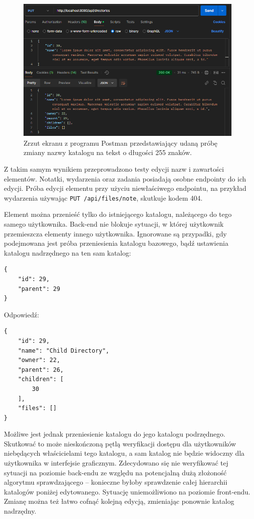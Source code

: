 \documentclass[a4paper,twoside,12pt]{book}
\begin{document}
\begin{figure}
\centering
\includegraphics[width=\textwidth]{./ChangeName255.png}
\caption{Zrzut ekranu z programu Postman przedstawiający udaną próbę zmiany nazwy katalogu na tekst o długości 255 znaków.}
\label{fig:change-name-255}
\end{figure}

Z takim samym wynikiem przeprowadzono testy edycji nazw i zawartości elementów. Notatki, wydarzenia oraz zadania posiadają osobne endpointy do ich edycji. Próba edycji elementu przy użyciu niewłaściwego endpointu, na przykład wydarzenia używając \texttt{PUT /api/files/note}, skutkuje kodem 404.

Element można przenieść tylko do istniejącego katalogu, należącego do tego samego użytkownika. Back-end nie blokuje sytuacji, w której użytkownik przemieszcza elementy innego użytkownika. Ignorowane są przypadki, gdy podejmowana jest próba przeniesienia katalogu bazowego, bądź ustawienia katalogu nadrzędnego na ten sam katalog:
\begin{verbatim}
{
	"id": 29,
	"parent": 29
}
\end{verbatim}
Odpowiedź:
\begin{verbatim}
{
	"id": 29,
	"name": "Child Directory",
	"owner": 22,
	"parent": 26,
	"children": [
		30
	],
	"files": []
}
\end{verbatim}

Możliwe jest jednak przeniesienie katalogu do jego katalogu podrzędnego. Skutkować to może nieskończoną pętlą weryfikacji dostępu dla użytkowników niebędących właścicielami tego katalogu, a sam katalog nie będzie widoczny dla użytkownika w interfejsie graficznym. Zdecydowano się nie weryfikować tej sytuacji na poziomie back-endu ze względu na potencjalną dużą złożoność algorytmu sprawdzającego -- konieczne byłoby sprawdzenie całej hierarchii katalogów poniżej edytowanego. Sytuację uniemożliwiono na poziomie front-endu. Zmianę można też łatwo cofnąć kolejną edycją, zmieniając ponownie katalog nadrzędny.
\end{document}
